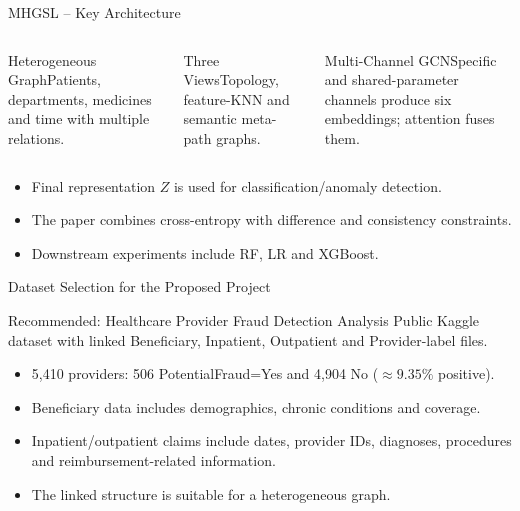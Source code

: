 \documentclass[aspectratio=169,11pt]{beamer}
\begin{document}
\begin{frame}{MHGSL -- Key Architecture}
\begin{columns}[T]
\begin{block}{Heterogeneous Graph}Patients, departments, medicines and time with multiple relations.\end{block}
\begin{block}{Three Views}Topology, feature-KNN and semantic meta-path graphs.\end{block}
\begin{block}{Multi-Channel GCN}Specific and shared-parameter channels produce six embeddings; attention fuses them.\end{block}
\end{columns}
\begin{itemize}
\item Final representation $Z$ is used for classification/anomaly detection.
\item The paper combines cross-entropy with difference and consistency constraints.
\item Downstream experiments include RF, LR and XGBoost.
\end{itemize}\end{frame}

\begin{frame}{Dataset Selection for the Proposed Project}
\begin{block}{Recommended: Healthcare Provider Fraud Detection Analysis}
Public Kaggle dataset with linked Beneficiary, Inpatient, Outpatient and Provider-label files.
\end{block}
\begin{itemize}
\item 5,410 providers: 506 PotentialFraud=Yes and 4,904 No ($\approx9.35\%$ positive).
\item Beneficiary data includes demographics, chronic conditions and coverage.
\item Inpatient/outpatient claims include dates, provider IDs, diagnoses, procedures and reimbursement-related information.
\item The linked structure is suitable for a heterogeneous graph.
\end{itemize}
\end{frame}
\end{document}
